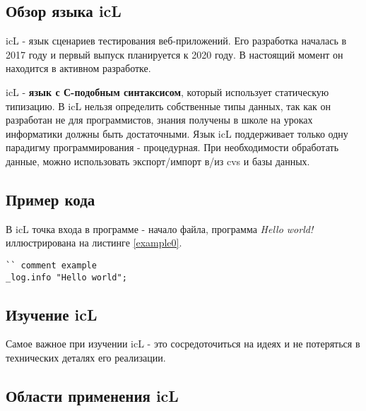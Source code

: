 \documentclass[a4paper, 14pt, russian]{extarticle}
\begin{document}
\subsection{Обзор языка icL}
	
	icL - язык сценариев тестирования веб-приложений. Его разработка началась в 2017 году и первый выпуск планируется к 2020 году. В настоящий момент он находится в активном разработке.
	
	icL - \textbf{язык с С-подобным синтаксисом}, который использует статическую типизацию. В icL нельзя определить собственные типы данных, так как он разработан не для программистов, знания получены в школе на уроках информатики должны быть достаточными. Язык icL поддерживает только одну парадигму программирования - процедурная. При необходимости обработать данные, можно использовать экспорт/импорт в/из cvs и базы данных.
	
\subsection{Пример кода}

	В icL точка входа в программе - начало файла, программа \textit{Hello world!} иллюстрирована на листинге \ref{example0}.
	
\begin{lstlisting}[caption=Пример, label=example0]
`` comment example
_log.info "Hello world";
\end{lstlisting}
  
\subsection{Изучение icL}
	
	Самое важное при изучении icL - это сосредоточиться на идеях и не потеряться в технических деталях его реализации.
	
\subsection{Области применения icL}
	
\end{document}
